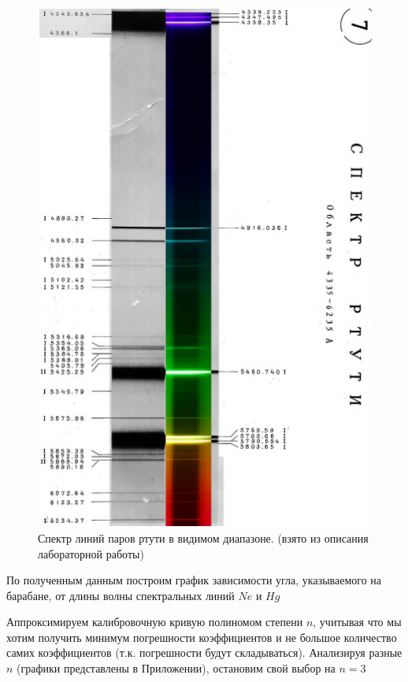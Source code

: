 \documentclass[a4paper,12pt]{article}
\begin{document}
\begin{figure}[h!]
	\centering
	\includegraphics[width=0.7\linewidth]{theor_Hg_spectre}
	\caption{Спектр линий паров ртути в видимом диапазоне. (взято из описания лабораторной работы)}
\end{figure}

По полученным данным построим график зависимости угла, указываемого на барабане, от длины волны спектральных линий $Ne$ и $Hg$

Аппроксимируем калибровочную кривую полиномом степени $n$, учитывая что мы хотим получить минимум погрешности коэффициентов и не большое количество самих коэффициентов (т.к. погрешности будут складываться). Анализируя разные $n$ (графики представлены в Приложении), остановим свой выбор на $n = 3$

\pagebreak
\end{document}
